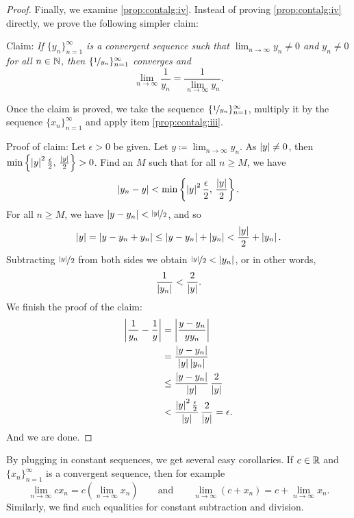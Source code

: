 \begin{proof}
Finally, we examine
\ref{prop:contalg:iv}.  Instead of proving 
\ref{prop:contalg:iv} directly, we prove the following simpler claim:

Claim: \emph{If $\{ y_n \}_{n=1}^\infty$ is a convergent sequence such that
$\lim_{n\to\infty} y_n \not= 0$ and $y_n \not= 0$ for all $n \in {\mathbb{N}}$, then
$\{ \nicefrac{1}{y_n} \}_{n=1}^\infty$ converges and}
\begin{equation*}
\lim_{n\to\infty} \frac{1}{y_n} = \frac{1}{\lim_{n\to\infty} y_n}  .
\end{equation*}

Once the claim is proved, we take the sequence
$\{ \nicefrac{1}{y_n} \}_{n=1}^\infty$,
multiply it by the sequence $\{ x_n \}_{n=1}^\infty$ and apply item
\ref{prop:contalg:iii}.

Proof of claim:  Let $\epsilon > 0$ be given.
Let $y \coloneqq \lim_{n\to\infty} y_n$.
As $\left\lvert {y} \right\rvert \not= 0$, then
$\min \left\{ \left\lvert {y} \right\rvert^2\frac{\epsilon}{2}, \, \frac{\left\lvert {y} \right\rvert}{2} \right\} > 0$.
Find an $M$ such that for all $n \geq M$,
we have
\begin{equation*}
\left\lvert {y_n - y} \right\rvert < \min \left\{ \left\lvert {y} \right\rvert^2\frac{\epsilon}{2}, \, \frac{\left\lvert {y} \right\rvert}{2}
\right\} .
\end{equation*}
For all $n \geq M$, we have
$\left\lvert {y - y_n} \right\rvert < \nicefrac{\left\lvert {y} \right\rvert}{2}$, and so
\begin{equation*}
\left\lvert {y} \right\rvert = 
\left\lvert {y - y_n + y_n } \right\rvert \leq
\left\lvert {y - y_n} \right\rvert + \left\lvert { y_n } \right\rvert < \frac{\left\lvert {y} \right\rvert}{2} + \left\lvert {y_n} \right\rvert.
\end{equation*}
Subtracting $\nicefrac{\left\lvert {y} \right\rvert}{2}$ from both sides we obtain
$\nicefrac{\left\lvert {y} \right\rvert}{2} < \left\lvert {y_n} \right\rvert$, or in other words,
\begin{equation*}
\frac{1}{\left\lvert {y_n} \right\rvert} < \frac{2}{\left\lvert {y} \right\rvert} .
\end{equation*}
We finish the proof of the claim:
\begin{equation*}
\begin{split}
\left\lvert {\frac{1}{y_n} - \frac{1}{y}} \right\rvert &=
\left\lvert {\frac{y - y_n}{y y_n}} \right\rvert \\
& =
\frac{\left\lvert {y - y_n} \right\rvert}{\left\lvert {y} \right\rvert \left\lvert {y_n} \right\rvert} \\
& \leq
\frac{\left\lvert {y - y_n} \right\rvert}{\left\lvert {y} \right\rvert} \, \frac{2}{\left\lvert {y} \right\rvert} \\
& <
\frac{\left\lvert {y} \right\rvert^2 \frac{\epsilon}{2}}{\left\lvert {y} \right\rvert} \, \frac{2}{\left\lvert {y} \right\rvert}
= \epsilon .
\end{split}
\end{equation*}
And we are done.
\end{proof}

By plugging in constant sequences, we get several easy corollaries.
If $c \in {\mathbb{R}}$ and $\{ x_n \}_{n=1}^\infty$ is a convergent sequence, then
for example
\begin{equation*}
\lim_{n \to \infty} c x_n = 
c \left( \lim_{n \to \infty} x_n \right) \qquad
\text{and}
\qquad
\lim_{n \to \infty} (c + x_n) = 
c + \lim_{n \to \infty} x_n .
\end{equation*}
Similarly, we find such equalities for constant subtraction and division.

